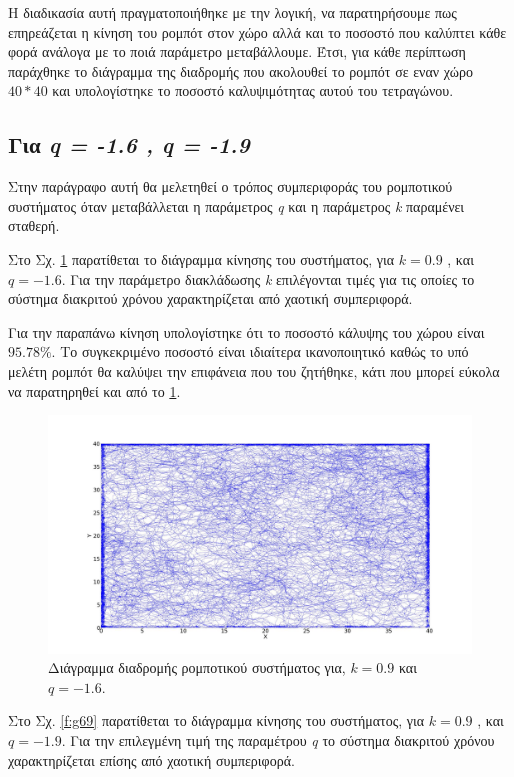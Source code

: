Η διαδικασία αυτή πραγματοποιήθηκε με την λογική, να παρατηρήσουμε πως επηρεάζεται η κίνηση του ρομπότ στον χώρο αλλά και το ποσοστό που καλύπτει κάθε φορά ανάλογα με το ποιά παράμετρο μεταβάλλουμε. 
Έτσι, για κάθε περίπτωση παράχθηκε το διάγραμμα της διαδρομής που ακολουθεί το ρομπότ σε εναν χώρο $40*40$ και υπολογίστηκε το ποσοστό καλυψιμότητας αυτού του τετραγώνου.

\subsection{Για \emph{q = -1.6 , q = -1.9}}

Στην παράγραφο αυτή θα μελετηθεί ο τρόπος συμπεριφοράς του ρομποτικού συστήματος όταν μεταβάλλεται η παράμετρος \emph{q} και η παράμετρος \emph{k} παραμένει σταθερή.

Στο Σχ. \ref{f:g68} παρατίθεται το διάγραμμα κίνησης του συστήματος, για $k=0.9$ , και $q = -1.6$. Για την παράμετρο διακλάδωσης \emph{k} επιλέγονται τιμές για τις οποίες το σύστημα διακριτού χρόνου χαρακτηρίζεται από χαοτική συμπεριφορά.

Για την παραπάνω κίνηση υπολογίστηκε ότι το ποσοστό κάλυψης του χώρου είναι
$95.78 \% $. Το συγκεκριμένο ποσοστό είναι ιδιαίτερα ικανοποιητικό καθώς το υπό μελέτη ρομπότ θα καλύψει την επιφάνεια που του ζητήθηκε, κάτι που μπορεί εύκολα να παρατηρηθεί και από το \ref{f:g68}.

\begin{figure}[ht]
	\centering
	\includegraphics[width=1\linewidth]{LateX images/log/q/g1-1.6}
	\caption{Διάγραμμα διαδρομής ρομποτικού συστήματος για, $k = 0.9$ και $q = -1.6$.}
	\label{f:g68}	
\end{figure}

\clearpage

Στο Σχ. \ref{f:g69} παρατίθεται το διάγραμμα κίνησης του συστήματος, για $k=0.9$ , και $q = -1.9$. Για την επιλεγμένη τιμή της παραμέτρου \emph{q} το σύστημα διακριτού χρόνου χαρακτηρίζεται επίσης από χαοτική συμπεριφορά.

